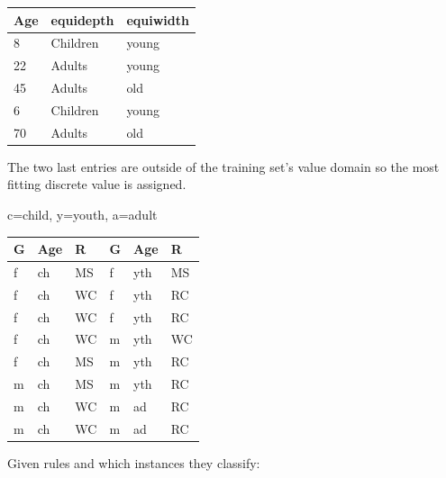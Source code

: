 \begin{breakbox}
\begin{tabular}{l|l|l}
\textbf{Age} & \textbf{equidepth} & \textbf{equiwidth} \\
\hline
8   & Children  & young     \\
22  & Adults    & young     \\
45  & Adults    & old       \\
6   & Children  & young     \\
70  & Adults    & old      
\end{tabular}

The two last entries are outside of the training set's value domain so the most fitting discrete value is assigned.

\end{breakbox}

\begin{breakbox}

c=child, y=youth, a=adult

\begin{tabular}{l|l|l||l|l|l}
\textbf{G} & \textbf{Age} & \textbf{R} & \textbf{G} & \textbf{Age} & \textbf{R} \\
\hline
f & ch & MS   & f & yth & MS   \\
f & ch & WC   & f & yth & RC   \\
f & ch & WC   & f & yth & RC   \\
f & ch & WC   & m & yth & WC   \\
f & ch & MS   & m & yth & RC   \\
m & ch & MS   & m & yth & RC   \\
m & ch & WC   & m & ad & RC   \\
m & ch & WC   & m & ad & RC  
\end{tabular}

Given rules and which instances they classify:


\end{breakbox}
